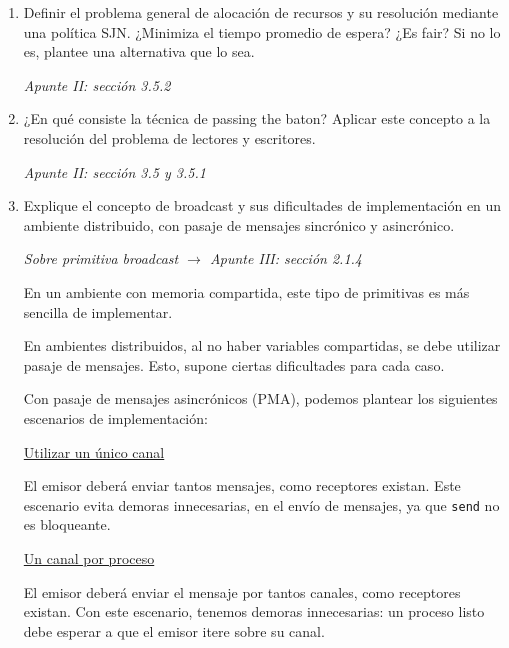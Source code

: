 \documentclass[a4paper, 10pt]{article}
\newenvironment{QandA}{
    \begin{enumerate}\bfseries}
    {\end{enumerate}
}
\newenvironment{answered}{\par\normalfont}{}
\begin{document}
\begin{QandA}

\item Definir el problema general de alocación de recursos y su resolución mediante una política SJN. ¿Minimiza el tiempo promedio de espera? ¿Es fair? Si no lo es, plantee una alternativa que lo sea.
\begin{answered}
    \emph{Apunte II: sección 3.5.2}
\end{answered}


\item ¿En qué consiste la técnica de passing the baton? Aplicar este concepto a la resolución del problema de lectores y escritores.
\begin{answered}
    \emph{Apunte II: sección 3.5 y 3.5.1}
\end{answered}


\item Explique el concepto de broadcast y sus dificultades de implementación en un ambiente distribuido, con pasaje de mensajes sincrónico y asincrónico.
\begin{answered}
\emph{Sobre primitiva broadcast $\rightarrow$ Apunte III: sección 2.1.4}

En un ambiente con memoria compartida, este tipo de primitivas es más sencilla de implementar.

En ambientes distribuidos, al no haber variables compartidas, se debe utilizar pasaje de mensajes. Esto, supone ciertas dificultades para cada caso.

Con pasaje de mensajes asincrónicos (PMA), podemos plantear los siguientes escenarios de implementación:

\underline{Utilizar un único canal}

El emisor deberá enviar tantos mensajes, como receptores existan. Este escenario evita demoras innecesarias, en el envío de mensajes, ya que \lstinline{send} no es bloqueante.

\underline{Un canal por proceso}

El  emisor  deberá  enviar  el  mensaje  por  tantos  canales,  como  receptores  existan.  Con  este  escenario, tenemos demoras innecesarias: un proceso listo debe esperar a que el emisor itere sobre su canal.


\end{answered}
\end{QandA}
\end{document}
